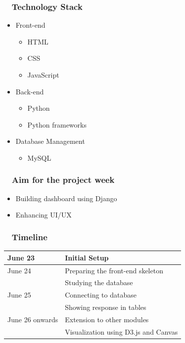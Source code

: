 \documentclass[xcolor={dvipsnames}]{beamer}
\begin{document}
\begin{frame}
\frametitle{ ~ Technology Stack} 
\begin {itemize}
\item Front-end
    \begin {itemize}
        \item{HTML} 
        \item{CSS}
        \item{JavaScript}
    \end{itemize}
\bigskip 
\item Back-end
    \begin {itemize}
        \item{Python} 
        \item{Python frameworks}
    \end{itemize}
\bigskip 
\item Database Management
    \begin {itemize}
        \item{MySQL}
    \end{itemize}
\end{itemize}
\end{frame}

\begin{frame}
\frametitle{ ~ Aim for the project week} 
\begin{itemize}
\item{Building dashboard using Django}
\item{Enhancing UI/UX}
\end{itemize}
\end{frame}






\begin{frame}
\frametitle{ ~ Timeline}
\begin{center}
\begin{tabular}{|l|l|}
     \hline
     June 23 & Initial Setup\\
     \hline
     June 24 & Preparing the front-end skeleton\\
     \hline & Studying the database\\
     \hline
     June 25 & Connecting to database\\
     \hline & Showing response in tables\\
     \hline
     June 26 onwards & Extension to other modules\\
     \hline
     & Visualization using D3.js and Canvas\\
     \hline
     
\end{tabular}
\end{center}    
\end{frame}
\end{document}
